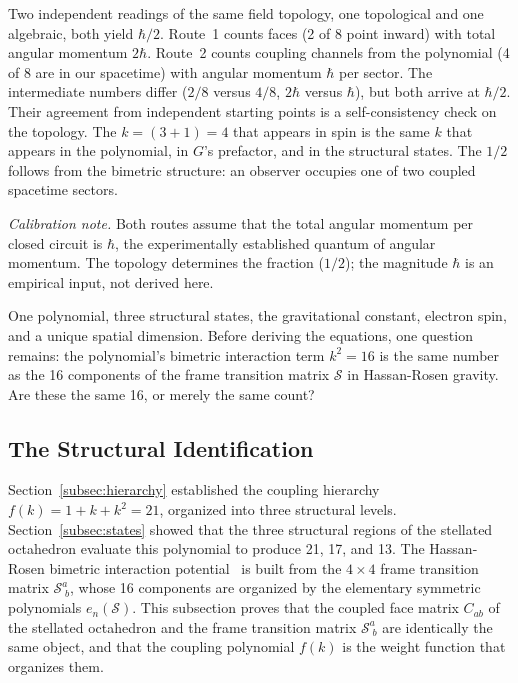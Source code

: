 \documentclass[aps,prd,preprint,superscriptaddress,showpacs,preprintnumbers,amsmath,amssymb,nofootinbib]{revtex4-2}
\begin{document}
Two independent readings of the same field topology, one topological and one algebraic, both yield $\hbar/2$. Route~1 counts faces (2 of 8 point inward) with total angular momentum $2\hbar$. Route~2 counts coupling channels from the polynomial (4 of 8 are in our spacetime) with angular momentum $\hbar$ per sector. The intermediate numbers differ ($2/8$ versus $4/8$, $2\hbar$ versus $\hbar$), but both arrive at $\hbar/2$. Their agreement from independent starting points is a self-consistency check on the topology. The $k = (3{+}1) = 4$ that appears in spin is the same $k$ that appears in the polynomial, in $G$'s prefactor, and in the structural states. The $1/2$ follows from the bimetric structure: an observer occupies one of two coupled spacetime sectors.

\noindent\textit{Calibration note.} Both routes assume that the total angular momentum per closed circuit is $\hbar$, the experimentally established quantum of angular momentum. The topology determines the fraction ($1/2$); the magnitude $\hbar$ is an empirical input, not derived here.

One polynomial, three structural states, the gravitational constant, electron spin, and a unique spatial dimension. Before deriving the equations, one question remains: the polynomial's bimetric interaction term $k^2 = 16$ is the same number as the 16 components of the frame transition matrix $\mathcal{S}$ in Hassan-Rosen gravity. Are these the same 16, or merely the same count?

\subsection{The Structural Identification}
\label{subsec:identification}

Section~\ref{subsec:hierarchy} established the coupling hierarchy $f(k) = 1 + k + k^2 = 21$, organized into three structural levels. Section~\ref{subsec:states} showed that the three structural regions of the stellated octahedron evaluate this polynomial to produce 21, 17, and 13. The Hassan-Rosen bimetric interaction potential~\cite{hassan2012} is built from the $4 \times 4$ frame transition matrix $\mathcal{S}^a_{\;b}$, whose 16 components are organized by the elementary symmetric polynomials $e_n(\mathcal{S})$. This subsection proves that the coupled face matrix $C_{ab}$ of the stellated octahedron and the frame transition matrix $\mathcal{S}^a_{\;b}$ are identically the same object, and that the coupling polynomial $f(k)$ is the weight function that organizes them.
\end{document}
